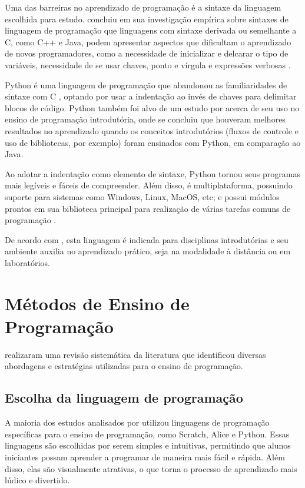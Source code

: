 Uma das barreiras no aprendizado de programação é a sintaxe da linguagem escolhida para estudo.  concluiu em sua investigação empírica sobre sintaxes de linguagem de programação que linguagens com sintaxe derivada ou semelhante a C, como C++ e Java, podem apresentar aspectos que dificultam o aprendizado de novos programadores, como a necessidade de inicializar e delcarar o tipo de variáveis, necessidade de se usar chaves, ponto e vírgula e expressões verbosas \cite{mannila2006}.

Python é uma linguagem de programação que abandonou as familiaridades de sintaxe com C \cite{stefik2013}, optando por usar a indentação ao invés de chaves para delimitar blocos de código. Python também foi alvo de um estudo por  acerca de seu uso no ensino de programação introdutória, onde se concluiu que houveram melhores resultados no aprendizado quando os conceitos introdutórios (fluxos de controle e uso de bibliotecas, por exemplo) foram ensinados com Python, em comparação ao Java.

Ao adotar a indentação como elemento de sintaxe, Python tornou seus programas mais legíveis e fáceis de compreender. Além disso, é multiplataforma, possuindo suporte para sistemas como Windows, Linux, MacOS, etc; e possui módulos prontos em sua biblioteca principal para realização de várias tarefas comuns de programação \cite{moraispires2002}.

De acordo com , esta linguagem é indicada para disciplinas introdutórias e seu ambiente auxilia no aprendizado prático, seja na modalidade à distância ou em laboratórios.

\section{Métodos de Ensino de Programação}

 realizaram uma revisão sistemática da literatura que identificou diversas abordagens e estratégias utilizadas para o ensino de programação.

\subsection{Escolha da linguagem de programação}

A maioria dos estudos analisados por  utilizou linguagens de programação específicas para o ensino de programação, como Scratch, Alice e Python. Essas linguagens são escolhidas por serem simples e intuitivas, permitindo que alunos iniciantes possam aprender a programar de maneira mais fácil e rápida. Além disso, elas são visualmente atrativas, o que torna o processo de aprendizado mais lúdico e divertido.

